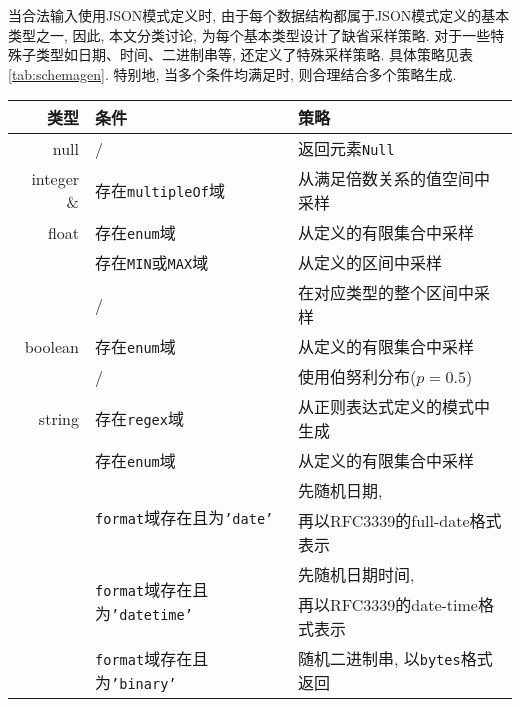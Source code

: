             当合法输入使用JSON模式定义时, 由于每个数据结构都属于JSON模式定义的基本类型之一, 因此, 本文分类讨论, 为每个基本类型设计了缺省采样策略. 对于一些特殊子类型如日期、时间、二进制串等, 还定义了特殊采样策略. 具体策略见表\ref{tab:schemagen}. 特别地, 当多个条件均满足时, 则合理结合多个策略生成.
            
            \begin{table}[!htb]
                \centering
                \begin{tabular}{rll}
                    \toprule
                    类型 & 条件 & 策略 \\
                    \midrule
                    null & / & 返回元素\texttt{Null} \\
                    \hline
                    integer \& & 存在\texttt{multipleOf}域 & 从满足倍数关系的值空间中采样 \\
                    \cline{2-3}
                    float & 存在\texttt{enum}域 & 从定义的有限集合中采样 \\
                    \cline{2-3}
                    & 存在\texttt{MIN}或\texttt{MAX}域 & 从定义的区间中采样 \\
                    \cline{2-3}
                    & / & 在对应类型的整个区间中采样 \\
                    \hline
                    boolean & 存在\texttt{enum}域 & 从定义的有限集合中采样 \\
                    \cline{2-3}
                    & / & 使用伯努利分布($p=0.5$) \\
                    \hline
                    string & 存在\texttt{regex}域 & 从正则表达式定义的模式中生成 \\
                    \cline{2-3}
                    & 存在\texttt{enum}域 & 从定义的有限集合中采样 \\
                    \cline{2-3}
                    & \multirow{2}{*}{\texttt{format}域存在且为\texttt{'date'}} & 先随机日期, \\
                    & & 再以RFC3339的full-date格式表示 \\
                    \cline{2-3}
                    & \multirow{2}{*}{\texttt{format}域存在且为\texttt{'datetime'}} & 先随机日期时间, \\
                    & & 再以RFC3339的date-time格式表示 \\
                    \cline{2-3}
                    & \texttt{format}域存在且为\texttt{'binary'} & 随机二进制串, 以\texttt{bytes}格式返回 \\

\end{tabular}
\end{table}

